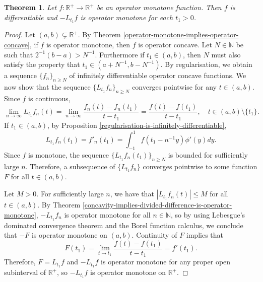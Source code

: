 \documentclass[12pt,a4paper]{amsart}
\newtheorem{theorem}{Theorem}
\theoremstyle{definition}
\newcommand{\myabs}[1]{ | #1 | }
\begin{document}
	\begin{theorem}\label{divided-difference-is-operator-monotone-decreasing}
		Let $f: \mathbb{R}^{+} \rightarrow \mathbb{R}^{+}$ be an operator monotone function. Then $f$ is differentiable and  $-L_{t_1}f$ is operator monotone for each $t_1 > 0$.
	\end{theorem}
	\begin{proof}
		Let  $(a, b) \subsetneq \mathbb{R}^{+}$. By Theorem \ref{operator-monotone-implies-operator-concave}, if $f$ is operator monotone, then $f$ is operator concave. Let $N \in \mathbb{N}$ be such that $2^{-1}(b-a) > N^{-1}$. Furthermore if $t_1 \in (a,b)$, then $N$ must also satisfy the property that  $t_1 \in (a + N^{-1}, b - N^{-1})$. By regularisation, we obtain a sequence $\lbrace f_n \rbrace_{n \geq N}$ of infinitely differentiable operator concave functions. We now show that the sequence $\lbrace L_{t_1}f_n \rbrace_{n \geq N}$ converges pointwise for any $t \in (a, b)$. Since $f$ is continuous,
		\[  \lim_{n \rightarrow \infty} L_{t_1}f_n(t) = \lim_{n \rightarrow \infty} \frac{f_n(t) - f_n(t_1)}{t-t_1} =  \frac{f(t) - f(t_1)}{t-t_1}, \quad t \in (a, b) \setminus \lbrace t_1 \rbrace. \]
		If $t_1 \in (a, b)$, by Proposition \ref{regularisation-is-infinitely-differentiable},
		\[ L_{t_1}f_n(t_1) = f'_n(t_1) = \int_{-1}^{1} f(t_1 - n^{-1}y) \phi'(y) dy. \]
		Since $f$ is monotone, the sequence $\lbrace L_{t_1}f_n(t_1) \rbrace_{n \geq N}$ is bounded for sufficiently large $n$. Therefore, a subsequence of $\lbrace L_{t_1}f_n \rbrace$ converges pointwise to some function $F$ for all $t \in (a, b)$.
		\par
		Let $M > 0$. For sufficiently large $n$, we have that $\myabs{L_{t_1}f_n(t)} \leq M$  for all $t \in (a, b)$. By Theorem \ref{concavity-implies-divided-difference-is-operator-monotone}, $-L_{t_1}f_n$ is operator monotone for all $n \in \mathbb{N}$, so by using Lebesgue's dominated convergence theorem and the Borel function calculus, we conclude that $-F$ is operator monotone on $(a, b)$. Continuity of $F$ implies that 
		\[  F(t_1) = \lim_{t \rightarrow t_1} \frac{f(t) - f(t_1)}{t-t_1} = f'(t_1).  \]
		Therefore, $F=L_{t_1}f$ and $-L_{t_1}f$ is operator monotone for any proper open subinterval of $\mathbb{R}^{+}$, so $-L_{t_1}f$ is operator monotone on $ \mathbb{R}^{+}$.
	\end{proof}
	
\end{document}
